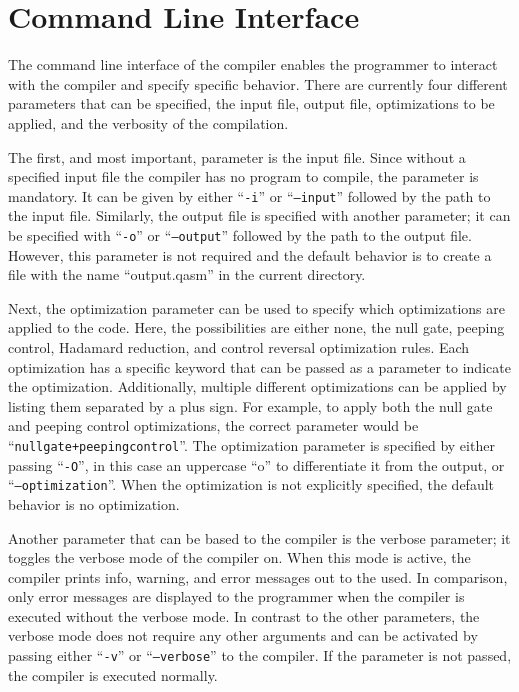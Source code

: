 \section{Command Line Interface}
The command line interface of the compiler enables the programmer to interact with the compiler and specify specific behavior. There are currently four different parameters that can be specified, the input file, output file, optimizations to be applied, and the verbosity of the compilation. 

The first, and most important, parameter is the input file. Since without a specified input file the compiler has no program to compile, the parameter is mandatory. It can be given by either ``\texttt{-i}'' or ``\texttt{--input}'' followed by the path to the input file. Similarly, the output file is specified with another parameter; it can be specified with ``\texttt{-o}'' or ``\texttt{--output}'' followed by the path to the output file.  However, this parameter is not required and the default behavior is to create a file with the name ``output.qasm'' in the current directory.

Next, the optimization parameter can be used to specify which optimizations are applied to the code. Here, the possibilities are either none, the null gate, peeping control, Hadamard reduction, and control reversal optimization rules. Each optimization has a specific keyword that can be passed as a parameter to indicate the optimization. Additionally, multiple different optimizations can be applied by listing them separated by a plus sign.
For example, to apply both the null gate and peeping control optimizations, the correct parameter would be ``\texttt{nullgate+peepingcontrol}''. The optimization parameter is specified by either passing ``\texttt{-O}'', in this case an uppercase ``o'' to differentiate it from the output, or ``\texttt{--optimization}''. When the optimization is not explicitly specified, the default behavior is no optimization. 

Another parameter that can be based to the compiler is the verbose parameter; it toggles the verbose mode of the compiler on. When this mode is active, the compiler prints info, warning, and error messages out to the used. In comparison, only error messages are displayed to the programmer when the compiler is executed without the verbose mode. In contrast to the other parameters, the verbose mode does not require any other arguments and can be activated by passing either ``\texttt{-v}'' or ``\texttt{--verbose}'' to the compiler. If the parameter is not passed, the compiler is executed normally. 

